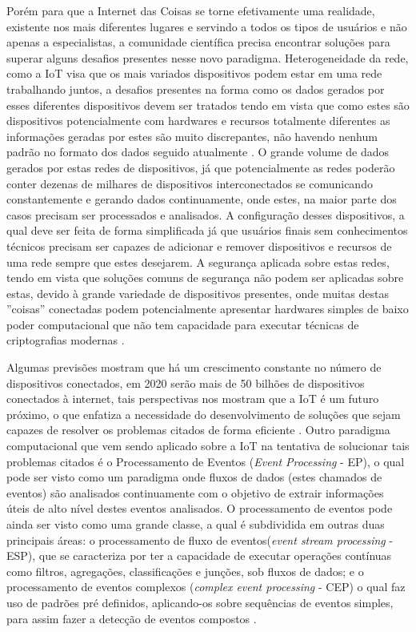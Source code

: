 \documentclass[ti,table]{texufpel} %
\begin{document}
Porém para que a Internet das Coisas se torne efetivamente uma realidade, existente nos mais diferentes lugares e servindo a todos os tipos de usuários e não apenas a especialistas, a comunidade científica precisa encontrar soluções para superar alguns desafios presentes nesse novo paradigma. Heterogeneidade da rede, como a IoT visa que os mais variados dispositivos podem estar em uma rede trabalhando juntos, a desafios presentes na forma como os dados gerados por esses diferentes dispositivos devem ser tratados tendo em vista que como estes são dispositivos potencialmente com hardwares e recursos totalmente diferentes as informações geradas por estes são muito discrepantes, não havendo nenhum padrão no formato dos dados seguido atualmente \cite{agrawal2013survey}. O grande volume de dados gerados por estas redes de dispositivos, já que potencialmente as redes poderão conter dezenas de milhares de dispositivos interconectados se comunicando constantemente e gerando dados continuamente, onde estes, na maior parte dos casos precisam ser processados e analisados. A configuração desses dispositivos, a qual deve ser feita de forma simplificada já que usuários finais sem conhecimentos técnicos precisam ser capazes de adicionar e remover dispositivos e recursos de uma rede sempre que estes desejarem. A segurança aplicada sobre estas redes, tendo em vista que soluções comuns de segurança não podem ser aplicadas sobre estas,  devido à grande variedade de dispositivos presentes, onde muitas destas ''coisas'' conectadas podem potencialmente apresentar hardwares simples de baixo poder computacional que não tem capacidade para executar técnicas de criptografias modernas \cite{agrawal2013survey}. 

  

  

Algumas previsões mostram que há um crescimento constante no número de dispositivos conectados, em 2020 serão mais de 50 bilhões de dispositivos conectados à internet, tais perspectivas nos mostram que a IoT é um futuro próximo, o que enfatiza a necessidade do desenvolvimento de soluções que sejam capazes de resolver os problemas citados de forma eficiente \cite{xavier2016smart}. Outro paradigma computacional que vem sendo aplicado sobre a IoT na tentativa de solucionar tais problemas citados é o  Processamento de Eventos (\textit{Event Processing} - EP), o qual pode ser visto como um paradigma onde fluxos de dados (estes chamados de eventos) são analisados continuamente com o objetivo de extrair informações úteis de alto nível destes eventos analisados. O processamento de eventos pode ainda ser visto como uma grande classe, a qual é subdividida em outras duas principais áreas: o processamento de fluxo de eventos(\textit{event stream processing} - ESP), que se caracteriza por ter a capacidade de executar operações contínuas como filtros, agregações, classificações e junções, sob fluxos de dados; e o processamento de eventos complexos (\textit{complex event processing} - CEP) o qual faz uso de padrões pré definidos, aplicando-os sobre sequências de eventos simples, para assim fazer a detecção de eventos compostos \cite{dayarathna2018recent}. 
\end{document}
